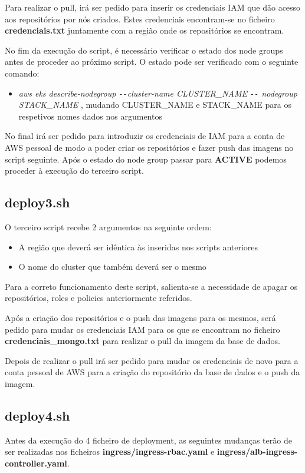 \documentclass[11pt,a4paper]{article}
\begin{document}
Para realizar o pull, irá ser pedido para inserir os credenciais IAM que dão acesso aos repositórios por nós criados. Estes credenciais encontram-se no ficheiro \textbf{credenciais.txt} juntamente com a região onde os repositórios se encontram.

No fim da execução do script, é necessário verificar o estado dos node groups antes de proceder ao próximo script. O estado pode ser verificado com o seguinte comando: 
\begin{itemize}
	\item \textit{aws eks describe-nodegroup \texttt{-{}-}cluster-name CLUSTER\_NAME \texttt{-{}-} nodegroup STACK\_NAME} , mudando CLUSTER\_NAME e STACK\_NAME para os respetivos nomes dados nos argumentos
\end{itemize}
No final irá ser pedido para introduzir os credenciais de IAM para a conta de AWS pessoal de modo a poder criar os repositórios e fazer push das imagens no script seguinte.
Após o estado do node group passar para \textbf{ACTIVE} podemos proceder à execução do terceiro script.

\subsection{deploy3.sh}
O terceiro script recebe 2 argumentos na seguinte ordem:
\begin{itemize}
	\item A região que deverá ser idêntica às inseridas nos scripts anteriores
	\item O nome do cluster que também deverá ser o mesmo
\end{itemize}
Para a correto funcionamento deste script, salienta-se a necessidade de apagar os repositórios, roles e policies anteriormente referidos.

Após a criação dos repositórios e o push das imagens para os mesmos, será pedido para mudar os credenciais IAM para os que se encontram no ficheiro \textbf{credenciais\_mongo.txt} para realizar o pull da imagem da base de dados.

Depois de realizar o pull irá ser pedido para mudar os credenciais de novo para a conta pessoal de AWS para a criação do repositório da base de dados e o push da imagem.

\subsection{deploy4.sh}
Antes da execução do 4 ficheiro de deployment, as seguintes mudanças terão de ser realizadas nos ficheiros \textbf{ingress/ingress-rbac.yaml} e \textbf{ingress/alb-ingress-controller.yaml}.
\end{document}
